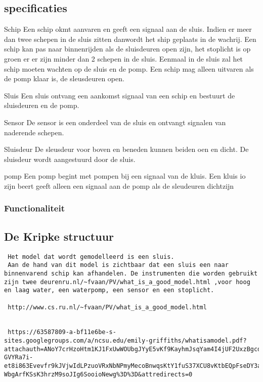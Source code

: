 \documentclass{article}
\begin{document}
\subsection{specificaties}
\par{Schip}
Een schip okmt aanvaren en geeft een signaal aan de sluis. Indien er meer dan twee schepen in de sluis zitten danwordt het ship geplaats in de wachrij. Een schip kan pas naar binnenrijden als de sluisdeuren open zijn, het stoplicht is op groen er er zijn minder dan 2 schepen in de sluis. Eenmaal in de sluis zal het schip moeten wachten op de sluis en de pomp. Een schip mag alleen uitvaren als de pomp klaar is, de sleusdeuren open.
\par{Sluis}
Een sluis ontvang een aankomst signaal van een schip en bestuurt de sluisdeuren en de pomp.
\par{Sensor}
De sensor is een onderdeel van de sluis en ontvangt signalen van naderende schepen.
\par{Sluisdeur}
De sleusdeur voor boven en beneden kunnen beiden oen en dicht. De sluisdeur wordt aangestuurd door de sluis.
\par{pomp}
Een pomp begint met pompen bij een signaal van de kluis. Een kluis io zijn beert geeft alleen een signaal aan de pomp als de sleudeuren dichtzijn

\subsubsection{Functionaliteit} 
\subsection{De Kripke structuur}
\begin{verbatim}
 Het model dat wordt gemodelleerd is een sluis.
 Aan de hand van dit model is zichtbaar dat een sluis een naar binnenvarend schip kan afhandelen. De instrumenten die worden gebruikt zijn twee deurenru.nl/~fvaan/PV/what_is_a_good_model.html ,voor hoog en laag water, een waterpomp, een sensor en een stoplicht.
 
 http://www.cs.ru.nl/~fvaan/PV/what_is_a_good_model.html
 
 
 https://63587809-a-bf11e6be-s-sites.googlegroups.com/a/ncsu.edu/emily-griffiths/whatisamodel.pdf?attachauth=ANoY7crHzoHtm1KJ1FxUwWOUbgJYyE5vKf9KayhmJsqYam4I4jUF2UxzBgcdKMOM04fo7YnXlD7sgmfSFmaZSaDGG0Ylu-GVYRa7i-et8i863Evevfr9kJVjwIdLPzuoVRxNbNPmyMecoBnwqsKtY1fuS37XCU8vKtbEQpFseDY3aN8ERZr5dX603a7lCJpQww-WbgArfKSsK3hrzM9soJIg6SooioNewg%3D%3D&attredirects=0
 
 
 
\end{verbatim}
\end{document}
